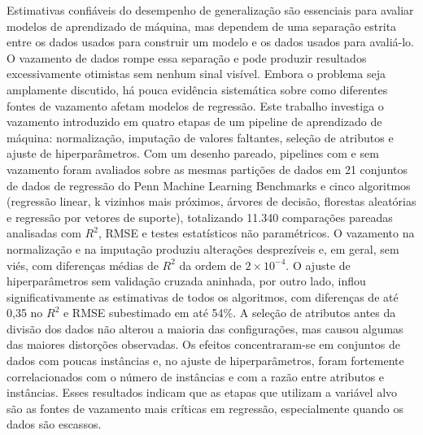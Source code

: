 \documentclass[ecp,tc,english]{infufrgs}
\begin{document}
\begin{translatedabstract}
Estimativas confi\'aveis do desempenho de generaliza\c{c}\~ao s\~ao essenciais para
avaliar modelos de aprendizado de m\'aquina, mas dependem de uma separa\c{c}\~ao
estrita entre os dados usados para construir um modelo e os dados usados para
avali\'a-lo. O vazamento de dados rompe essa separa\c{c}\~ao e pode produzir
resultados excessivamente otimistas sem nenhum sinal vis\'ivel. Embora o
problema seja amplamente discutido, h\'a pouca evid\^encia sistem\'atica sobre
como diferentes fontes de vazamento afetam modelos de regress\~ao. Este trabalho
investiga o vazamento introduzido em quatro etapas de um pipeline de
aprendizado de m\'aquina: normaliza\c{c}\~ao, imputa\c{c}\~ao de valores
faltantes, sele\c{c}\~ao de atributos e ajuste de hiperpar\^ametros. Com um
desenho pareado, pipelines com e sem vazamento foram avaliados sobre as mesmas
parti\c{c}\~oes de dados em 21 conjuntos de dados de regress\~ao do Penn Machine
Learning Benchmarks e cinco algoritmos (regress\~ao linear, k vizinhos mais
pr\'oximos, \'arvores de decis\~ao, florestas aleat\'orias e regress\~ao por
vetores de suporte), totalizando 11.340 compara\c{c}\~oes pareadas analisadas
com $R^2$, RMSE e testes estat\'isticos n\~ao param\'etricos. O vazamento na
normaliza\c{c}\~ao e na imputa\c{c}\~ao produziu altera\c{c}\~oes desprez\'iveis
e, em geral, sem vi\'es, com diferen\c{c}as m\'edias de $R^2$ da ordem de
$2\times10^{-4}$. O ajuste de hiperpar\^ametros sem valida\c{c}\~ao cruzada
aninhada, por outro lado, inflou significativamente as estimativas de todos os
algoritmos, com diferen\c{c}as de at\'e 0,35 no $R^2$ e RMSE subestimado em at\'e
54\%. A sele\c{c}\~ao de atributos antes da divis\~ao dos dados n\~ao alterou a
maioria das configura\c{c}\~oes, mas causou algumas das maiores distor\c{c}\~oes
observadas. Os efeitos concentraram-se em conjuntos de dados com poucas
inst\^ancias e, no ajuste de hiperpar\^ametros, foram fortemente correlacionados
com o n\'umero de inst\^ancias e com a raz\~ao entre atributos e inst\^ancias.
Esses resultados indicam que as etapas que utilizam a vari\'avel alvo s\~ao as
fontes de vazamento mais cr\'iticas em regress\~ao, especialmente quando os
dados s\~ao escassos.
\end{translatedabstract}

\tableofcontents
\listoffigures
\listoftables
\end{document}
